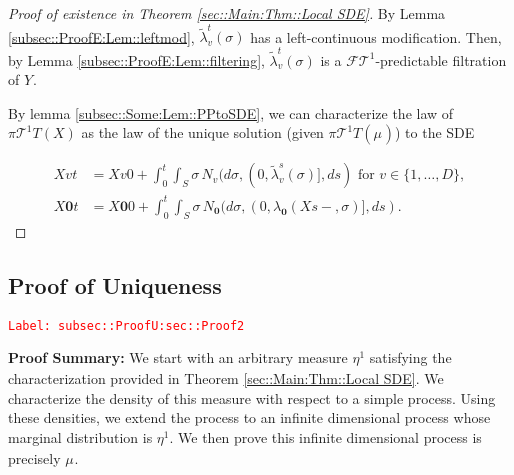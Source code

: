 \documentclass[12pt]{article}
\newcommand{\mc}{\mathcal}
\newcommand{\te}{\text}
\newcommand{\tr}{\textcolor{red}}
\newcommand{\labe}[1]{\tr{\texttt{Label: #1}}}
\newcommand{\pfsum}{\textbf{Proof Summary: }}
\newcommand{\ind}{\hspace{24pt}}
\renewcommand{\root}{\mathbf{0}}				%
\renewcommand{\v}{v}							%
\renewcommand{\S}{S}							%
\newcommand{\s}{\sigma}							%
\newcommand{\T}{T}								%
\renewcommand{\t}{t}							%
\newcommand{\proj}{\pi}							%
\renewcommand{\tt}{s}							%
\newcommand{\F}{\mc{F}}							%
\newcommand{\X}{X}								%
\newcommand{\degr}{D}								%
\newcommand{\poiss}[1]{N_{#1}}						%
\newcommand{\pup}[1]{^{#1}}							%
\newcommand{\tree}{\mc{T}}							%
\newcommand{\rxvtts}[2]{Y_{#1}{#2}}					%
\newcommand{\m}[3]{\mu_{#2#1}^{#3}}						%
\newcommand{\mmm}[3]{\eta_{#2#1}^{#3}}						%
\newcommand{\rate}[1]{\lambda_{#1}}					%
\newcommand{\crate}[2]{\alt{\lambda}_{#1}^{#2}}		%
\newcommand{\alt}{\widetilde}						%
\begin{document}
\begin{proof}[Proof of existence in Theorem \ref{sec::Main:Thm::Local SDE}]
By Lemma \ref{subsec::ProofE:Lem::leftmod}, \(\crate{\v}{\t}(\s)\) has a left-continuous modification. Then, by Lemma \ref{subsec::ProofE:Lem::filtering}, \(\crate{\v}{\t}(\s)\) is a \(\F{\tree\pup{1}}{}\)-predictable filtration of \(\rxvtts{}{}\).

\ind By lemma \ref{subsec::Some:Lem::PPtoSDE}, we can characterize the law of \(\proj{\tree\pup{1}}{\T}(\X{}{})\) as the law of the unique solution (given \(\proj{\tree\pup{1}}{\T}(\m{}{}{})\)) to the SDE

\begin{align*}
\X{\v}{\t} &= \X{\v}{0} + \int_0^\t\int_\S \s\,\poiss{\v}(d\s,(0,\crate{\v}{\tt}(\s)],d\tt) \te{ for } \v \in \{1,\dots,\degr\},\\
\X{\root}{\t} &= \X{\root}{0} + \int_0^\t\int_\S \s\,\poiss{\root}(d\s,(0,\rate{\root}(\X{}{\tt-},\s)],d\tt).
\end{align*}
\end{proof}

\subsection{Proof of Uniqueness}
\label{subsec::ProofU:sec::Proof2}\labe{subsec::ProofU:sec::Proof2}

\pfsum We start with an arbitrary measure \(\mmm{}{}{1}\) satisfying the characterization provided in Theorem \ref{sec::Main:Thm::Local SDE}. We characterize the density of this measure with respect to a simple process. Using these densities, we extend the process to an infinite dimensional process whose marginal distribution is \(\mmm{}{}{1}\). We then prove this infinite dimensional process is precisely \(\m{}{}{}\).
\end{document}
